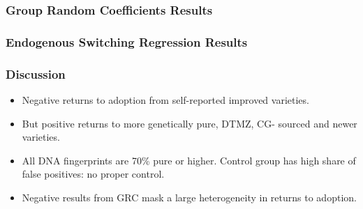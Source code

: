 \documentclass{beamer}
\begin{document}
\begin{frame}
\frametitle{Group Random Coefficients Results}

 
\end{frame}


\begin{frame}
\frametitle{Endogenous Switching Regression Results}



 
\end{frame}

\begin{frame}
\frametitle{Discussion}

\begin{itemize}
    \item Negative returns to adoption from self-reported improved varieties.
    \item But positive returns to more genetically pure, DTMZ, CG- sourced and newer varieties.
    \item All DNA fingerprints are 70\% pure or higher. Control group has high share of false positives: no proper control. 
    \item Negative results from GRC mask a large heterogeneity in returns to adoption.
\end{itemize}  
 
\end{frame}

\end{document}

